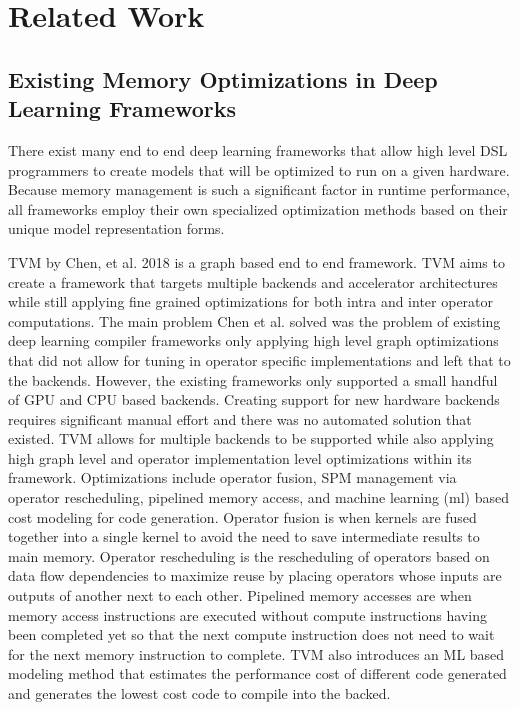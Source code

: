 
\chapter{Related Work} %

\label{Chapter2} %

\section{Existing Memory Optimizations in Deep Learning Frameworks}
There exist many end to end deep learning frameworks that allow
high level DSL programmers to create models that will be optimized to run
on a given hardware. Because memory management is such a significant
factor in runtime performance, all frameworks employ their own specialized
optimization methods based on their unique model representation forms.


TVM by Chen, et al. 2018 is a graph based end to end framework. 
TVM aims to create a framework that targets
multiple backends and accelerator architectures while still applying
fine grained optimizations for both intra and inter operator computations.
The main problem Chen et al. solved was the problem of existing deep learning
compiler frameworks only applying high level graph optimizations that did
not allow for tuning in operator specific implementations and left that to
the backends. However, the existing frameworks only supported a small handful
of GPU and CPU based backends. Creating support for new hardware backends
requires significant manual effort and there was no automated solution that 
existed. TVM allows for multiple backends to be supported while also
applying high graph level and operator implementation level optimizations
within its framework. Optimizations include operator fusion, SPM management via
operator rescheduling, pipelined memory access, and machine learning (ml) based
cost modeling for code generation. Operator fusion is when kernels are fused
together into a single kernel to avoid the need to save intermediate results
to main memory. Operator rescheduling is the rescheduling of operators based
on data flow dependencies to maximize reuse by placing operators whose
inputs are outputs of another next to each other. Pipelined memory accesses are
when memory access instructions are executed without compute instructions having
been completed yet so that the next compute instruction does not need to wait
for the next memory instruction to complete. TVM also introduces an ML
based modeling method that estimates the performance cost of different
code generated and generates the lowest cost code to compile into the backed.

